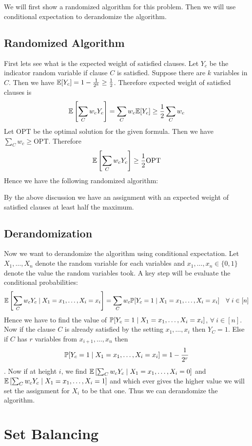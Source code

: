 \section{}
\begin{algoprob}
\end{algoprob}

We will first show a randomized algorithm for this problem. Then we will use conditional expectation to derandomize the algorithm.
\subsection{Randomized Algorithm}
First lets see what is the expected weight of satisfied clauses. Let $Y_c$ be the indicator random variable if clause $C$ is satisfied. Suppose there are $k$ variables in $C$. Then we have $\mathbb{E}[Y_c]=1-\frac1{2^k}\geq \frac12$. Therefore expected weight of satisfied clauses is $$\mathbb{E}\left[\sum_{C}w_cY_c\right]=\sum_Cw_c\mathbb{E}[Y_c]\geq \frac12\sum_Cw_c$$Let OPT be the optimal  solution for the given formula. Then we have $\sum\limits_Cw_c\geq \text{OPT}$.  Therefore $$\mathbb{E}\left[\sum_{C}w_cY_c\right]\geq \frac12\text{OPT}$$Hence we have the following randomized algorithm:

\begin{algorithm}
\DontPrintSemicolon
{}
\caption{}
\end{algorithm}

By the above discussion we have an assignment with an expected weight of satisfied clauses at least half the maximum.
\subsection{Derandomization}
Now we want to derandomize  the algorithm using conditional expectation. Let $X_1,\dots, X_n$ denote the random variable for each variables and $x_1,\dots, x_n\in \{0,1\}$ denote the value the random variables took. A key step will be evaluate the conditional probabilities: $$\mathbb{E}\left[\sum_Cw_cY_c\mid X_1=x_1,\dots, X_i=x_i\right]=\sum_Cw_c\mathbb{P}[Y_c=1\mid X_1=x_1,\dots, X_i=x_i]\quad \forall\ i\in[n]$$Hence we have to find the value of $\mathbb{P}[Y_c=1\mid X_1=x_1,\dots, X_i=x_i]$, $\forall\ i\in[n]$. Now if the clause $C$ is already satisfied by the setting $x_1,\dots, x_i$ then $Y_C=1$. Else if $C$ has $r$ variables from $x_{i+1},\dots, x_n$ then $$\mathbb{P}[Y_c=1\mid X_1=x_1,\dots, X_i=x_i]=1-\frac1{2^r}$$. Now if at height $i$, we find $\mathbb{E}\left[\sum_Cw_cY_c\mid X_1=x_1,\dots, X_i=0\right]$ and $\mathbb{E}\left[\sum_Cw_cY_c\mid X_1=x_1,\dots, X_i=1\right]$ and which ever gives the higher value we will set the assignment for $X_i$ to be that one. Thus we can derandomize the algorithm.
\section{Set Balancing}